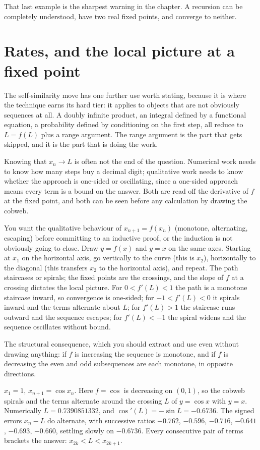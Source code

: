 That last example is the sharpest warning in the chapter. A recursion can be completely understood, have two real fixed points, and converge to neither.

\section{Rates, and the local picture at a fixed point}

The self-similarity move has one further use worth stating, because it is where the technique earns its hard tier: it applies to objects that are not obviously sequences at all. A doubly infinite product, an integral defined by a functional equation, a probability defined by conditioning on the first step, all reduce to $L=f(L)$ plus a range argument. The range argument is the part that gets skipped, and it is the part that is doing the work.

Knowing that $x_n\to L$ is often not the end of the question. Numerical work needs to know how many steps buy a decimal digit; qualitative work needs to know whether the approach is one-sided or oscillating, since a one-sided approach means every term is a bound on the answer. Both are read off the derivative of $f$ at the fixed point, and both can be seen before any calculation by drawing the cobweb.

\cue You want the qualitative behaviour of $x_{n+1}=f(x_n)$ (monotone, alternating, escaping) before committing to an inductive proof, or the induction is not obviously going to close.
\method Draw $y=f(x)$ and $y=x$ on the same axes. Starting at $x_1$ on the horizontal axis, go vertically to the curve (this is $x_2$), horizontally to the diagonal (this transfers $x_2$ to the horizontal axis), and repeat. The path staircases or spirals; the fixed points are the crossings, and the slope of $f$ at a crossing dictates the local picture. For $0<f'(L)<1$ the path is a monotone staircase inward, so convergence is one-sided; for $-1<f'(L)<0$ it spirals inward and the terms alternate about $L$; for $f'(L)>1$ the staircase runs outward and the sequence escapes; for $f'(L)<-1$ the spiral widens and the sequence oscillates without bound.

The structural consequence, which you should extract and use even without drawing anything: if $f$ is increasing the sequence is monotone, and if $f$ is decreasing the even and odd subsequences are each monotone, in opposite directions.

\begin{worked}
$x_1=1$, $x_{n+1}=\cos x_n$. Here $f=\cos$ is decreasing on $(0,1)$, so the cobweb spirals and the terms alternate around the crossing $L$ of $y=\cos x$ with $y=x$. Numerically $L=0.7390851332$, and $\cos'(L)=-\sin L=-0.6736$. The signed errors $x_n-L$ do alternate, with successive ratios $-0.762$, $-0.596$, $-0.716$, $-0.641$, $-0.693$, $-0.660$, settling slowly on $-0.6736$. Every consecutive pair of terms brackets the answer: $x_{2k}<L<x_{2k+1}$.
\end{worked}

